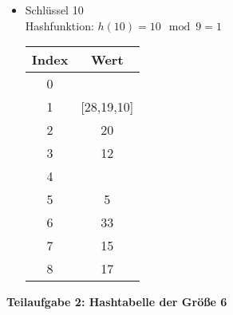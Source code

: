 \begin{multicols}{2}
\begin{itemize}
\columnbreak
\item Schlüssel 10\\
Hashfunktion: $h(10) = 10 \mod 9 = 1$

\begin{center}
\begin{tabular}{c|c}
Index & Wert \\
\hline
0 & \\
1 & [28,19,10]\\
2 & 20\\
3 & 12\\
4 & \\
5 & 5\\
6 & 33\\
7 & 15\\
8 & 17\\
\end{tabular}
\end{center}
\end{itemize}
\end{multicols}


\noindent
\textbf{Teilaufgabe 2: Hashtabelle der Größe 6}

